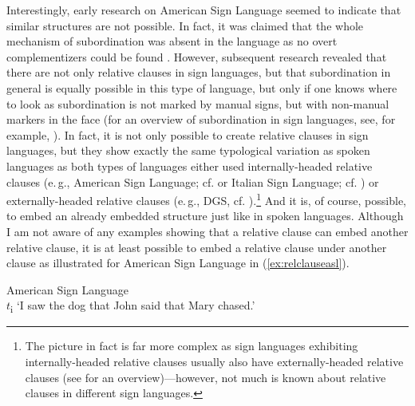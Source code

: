 Interestingly, early research on American Sign Language seemed to indicate that similar structures are not possible. In fact, it was claimed that the whole mechanism of subordination was absent in the language as no overt complementizers could be found \citep{thompson1977lack}. However, subsequent research revealed that there are not only relative clauses in sign languages, but that subordination in general is equally possible in this type of language, but only if one knows where to look as subordination is not marked by manual signs, but with non-manual markers in the face \citep{liddell1980american, padden1983action} (for an overview of subordination in sign languages, see, for example, \citealt{gijn2004quest,branchini2014,pfausteinher2016matterofcompl,pfausteinbach2016complexsentences}). In fact, it is not only possible to create relative clauses in sign languages, but they show exactly the same typological variation as spoken languages as both types of languages either used internally-headed relative clauses (e.\,g., American Sign Language; cf. \citealt{liddell1980american} or Italian Sign Language; cf. \citealt{branchini2014}) or externally-headed relative clauses (e.\,g., DGS, cf.  \citealt{pfau2005relative}).\footnote{ The picture in fact is far more complex as sign languages exhibiting internally-headed relative clauses usually also have externally-headed relative clauses (see \citealt{wilbur2017internally} for an overview)---however, not much is known about relative clauses in different sign languages.} And it is, of course, possible, to embed an already embedded structure just like in spoken languages. Although I am not aware of any examples showing that a relative clause can embed another relative clause, it is at least possible to embed a relative clause under another clause as illustrated for American Sign Language in (\ref{ex:relclauseasl}). 

\begin{exe}
\ex American Sign Language \citep[10]{wilbur2017internally}\\ %
   $t$\textsubscript{i} 
\glt `I saw the dog that John said that Mary chased.' \label{ex:relclauseasl} 
\end{exe} 

